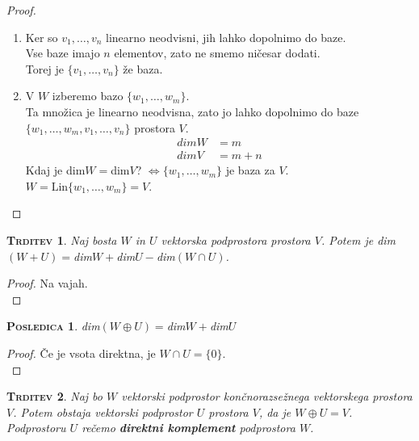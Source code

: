 \documentclass[a4paper,12pt]{article}
\newtheorem*{trditev}{\textsc{Trditev}}
\newtheorem*{posledica}{\textsc{Posledica}}
\begin{document}
\begin{proof}~
\begin{enumerate}
\item Ker so $v_1,\ldots,v_n$ linearno neodvisni, jih lahko dopolnimo do baze. \\

Vse baze imajo $n$ elementov, zato ne smemo ničesar dodati.\\

 Torej je $\{v_1,\ldots,v_n\}$ že baza.\\
 
\item V $W$ izberemo bazo $\{w_1,\ldots,w_m\}$. \\

Ta množica je linearno neodvisna, zato jo lahko dopolnimo do baze $\{w_1,\ldots,w_m,v_1,\ldots,v_n\}$ prostora $V$.
\begin{align*}
dimW & = m \\
dimV &=m+n
\end{align*}
Kdaj je dim$W=$dim$V$? $\Leftrightarrow \{w_1,\ldots,w_m\}$ je baza za $V$. \\

$W=\text{Lin}\{w_1,\ldots,w_m\}=V$. 
\end{enumerate}
\end{proof}

\begin{trditev}
Naj bosta $W$ in $U$ vektorska podprostora prostora $V$. Potem je  \linebreak dim$(W+U)=$dim$W+$dim$U-$dim$(W\cap U)$. \\
\end{trditev}

\begin{proof}
Na vajah.\\
\end{proof}

\begin{posledica}
dim$(W \oplus U)=$dim$W+$dim$U$\\
\end{posledica}

\begin{proof}
Če je vsota direktna, je $W\cap U=\{0\}$.\\
\end{proof}

\begin{trditev}
Naj bo $W$ vektorski podprostor končnorazsežnega vektorskega prostora $V$. \linebreak Potem obstaja vektorski podprostor $U$ prostora $V$, da je $W \oplus U=V$. Podprostoru $U$ rečemo \linebreak \textbf{direktni komplement} podprostora $W$. \\
\end{trditev}
\end{document}
